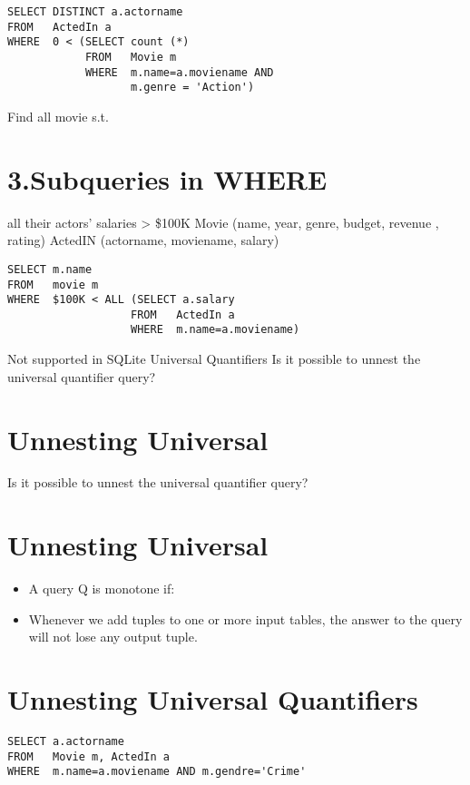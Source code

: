 \documentclass{article}
\begin{document}
\begin{verbatim}
SELECT DISTINCT a.actorname
FROM   ActedIn a
WHERE  0 < (SELECT count (*)
            FROM   Movie m
            WHERE  m.name=a.moviename AND
                   m.genre = 'Action')
\end{verbatim}

Find all movie s.t.

\section*{3.Subqueries in WHERE}

all their actors' salaries > \$100K Movie (name, year, genre, budget, revenue , rating) ActedIN (actorname, moviename, salary)

\begin{verbatim}
SELECT m.name
FROM   movie m
WHERE  $100K < ALL (SELECT a.salary
                   FROM   ActedIn a
                   WHERE  m.name=a.moviename)
\end{verbatim}

Not supported in SQLite Universal Quantifiers Is it possible to unnest the universal quantifier query?

\section*{Unnesting Universal}

Is it possible to unnest the universal quantifier query?

\section*{Unnesting Universal}

\begin{itemize}
\item A query Q is monotone if:
\item Whenever we add tuples to one or more input tables, the answer to the query will not lose any output tuple.
\end{itemize}

\section*{Unnesting Universal Quantifiers}

\begin{verbatim}
SELECT a.actorname
FROM   Movie m, ActedIn a
WHERE  m.name=a.moviename AND m.gendre='Crime'
\end{verbatim}
\end{document}
